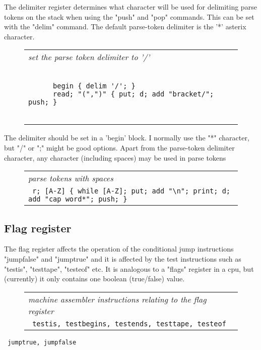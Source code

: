 \documentclass[a4paper,12pt]{article}
\begin{document}
  The delimiter register determines what character will be used for
  delimiting parse tokens on the stack when using the "push" and "pop"
  commands. This can be set with the "delim" command. The default
  parse-token delimiter is the '*' asterix character.
 \begin{figure}
 \begin{tabular}{ l }
 \emph{ set the parse token delimiter to '/' } \\ 
 \begin{lstlisting}[breaklines] 

      begin { delim '/'; }
      read; "(",")" { put; d; add "bracket/"; push; }  
    
 \end{lstlisting} 
 \end{tabular} 

 \end{figure}

  The delimiter should be set in a 'begin' block. I normally use the "*"
  character, but "/" or ";" might be good options. Apart from the parse-token
  delimiter character, any character (including spaces) may be used in parse
  tokens
 \begin{figure}
 \begin{tabular}{ l }
 \emph{ parse tokens with spaces  } \\ 
 \verb| r; [A-Z] { while [A-Z]; put; add "\n"; print; d; add "cap word*"; push; } |
 \end{tabular} 
 \end{figure}

\subsection{Flag register}

  The flag register affects the operation of the conditional jump instructions
  "jumpfalse" and "jumptrue" and it is affected by the test instructions such
  as "testis", "testtape", "testeof" etc. It is analogous to a "flags"
  register in a cpu, but (currently) it only contains one boolean (true/false)
  value.
 \begin{figure}
 \begin{tabular}{ l }
 \emph{ machine assembler instructions relating to the flag register } \\ 
 \verb| testis, testbegins, testends, testtape, testeof  |
 \end{tabular} 
 \end{figure} 
 \verb| jumptrue, jumpfalse |
\end{document}
